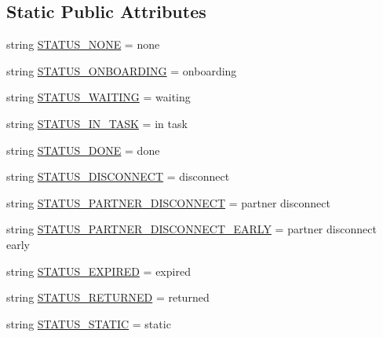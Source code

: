 \subsection*{Static Public Attributes}
\begin{DoxyCompactItemize}
\item 
string \hyperlink{classparlai_1_1mturk_1_1core_1_1dev_1_1agents_1_1AssignState_a3fd71961d3e2624a38105862a628d9da}{S\+T\+A\+T\+U\+S\+\_\+\+N\+O\+NE} = \textquotesingle{}none\textquotesingle{}
\item 
string \hyperlink{classparlai_1_1mturk_1_1core_1_1dev_1_1agents_1_1AssignState_ae9c2129bb05f735024f694e24b99b854}{S\+T\+A\+T\+U\+S\+\_\+\+O\+N\+B\+O\+A\+R\+D\+I\+NG} = \textquotesingle{}onboarding\textquotesingle{}
\item 
string \hyperlink{classparlai_1_1mturk_1_1core_1_1dev_1_1agents_1_1AssignState_a16f109111265fa6c067aac1a32f47c3f}{S\+T\+A\+T\+U\+S\+\_\+\+W\+A\+I\+T\+I\+NG} = \textquotesingle{}waiting\textquotesingle{}
\item 
string \hyperlink{classparlai_1_1mturk_1_1core_1_1dev_1_1agents_1_1AssignState_a4e784c3ceea25b6b16a113c87edb467c}{S\+T\+A\+T\+U\+S\+\_\+\+I\+N\+\_\+\+T\+A\+SK} = \textquotesingle{}in task\textquotesingle{}
\item 
string \hyperlink{classparlai_1_1mturk_1_1core_1_1dev_1_1agents_1_1AssignState_ac3bf786f4f7e74e83c5c6eac2e447f4a}{S\+T\+A\+T\+U\+S\+\_\+\+D\+O\+NE} = \textquotesingle{}done\textquotesingle{}
\item 
string \hyperlink{classparlai_1_1mturk_1_1core_1_1dev_1_1agents_1_1AssignState_a1a015796330e6430c736038476dd1097}{S\+T\+A\+T\+U\+S\+\_\+\+D\+I\+S\+C\+O\+N\+N\+E\+CT} = \textquotesingle{}disconnect\textquotesingle{}
\item 
string \hyperlink{classparlai_1_1mturk_1_1core_1_1dev_1_1agents_1_1AssignState_a3fa1c84e6a814a628d357ffa6801e22d}{S\+T\+A\+T\+U\+S\+\_\+\+P\+A\+R\+T\+N\+E\+R\+\_\+\+D\+I\+S\+C\+O\+N\+N\+E\+CT} = \textquotesingle{}partner disconnect\textquotesingle{}
\item 
string \hyperlink{classparlai_1_1mturk_1_1core_1_1dev_1_1agents_1_1AssignState_ad9ecda0f27857038f99217b0d35320e6}{S\+T\+A\+T\+U\+S\+\_\+\+P\+A\+R\+T\+N\+E\+R\+\_\+\+D\+I\+S\+C\+O\+N\+N\+E\+C\+T\+\_\+\+E\+A\+R\+LY} = \textquotesingle{}partner disconnect early\textquotesingle{}
\item 
string \hyperlink{classparlai_1_1mturk_1_1core_1_1dev_1_1agents_1_1AssignState_a2074e5b4fa52413b30981b6b1962cb79}{S\+T\+A\+T\+U\+S\+\_\+\+E\+X\+P\+I\+R\+ED} = \textquotesingle{}expired\textquotesingle{}
\item 
string \hyperlink{classparlai_1_1mturk_1_1core_1_1dev_1_1agents_1_1AssignState_a3b2a99def4ebaa0c11c535aba4f7453b}{S\+T\+A\+T\+U\+S\+\_\+\+R\+E\+T\+U\+R\+N\+ED} = \textquotesingle{}returned\textquotesingle{}
\item 
string \hyperlink{classparlai_1_1mturk_1_1core_1_1dev_1_1agents_1_1AssignState_aecc8d1b0324488a96a810acf1d2f745c}{S\+T\+A\+T\+U\+S\+\_\+\+S\+T\+A\+T\+IC} = \textquotesingle{}static\textquotesingle{}
\end{DoxyCompactItemize}


